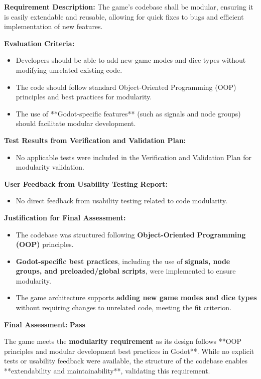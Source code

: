 \documentclass[12pt, titlepage]{article}
\begin{document}
\textbf{Requirement Description:}  
The game’s codebase shall be modular, ensuring it is easily extendable and reusable, allowing for quick fixes to bugs and efficient implementation of new features.

\textbf{Evaluation Criteria:}  
\begin{itemize}
    \item Developers should be able to add new game modes and dice types without modifying unrelated existing code.
    \item The code should follow standard Object-Oriented Programming (OOP) principles and best practices for modularity.
    \item The use of **Godot-specific features** (such as signals and node groups) should facilitate modular development.
\end{itemize}

\textbf{Test Results from Verification and Validation Plan:}  
\begin{itemize}
    \item No applicable tests were included in the Verification and Validation Plan for modularity validation.
\end{itemize}

\textbf{User Feedback from Usability Testing Report:}  
\begin{itemize}
    \item No direct feedback from usability testing related to code modularity.
\end{itemize}

\textbf{Justification for Final Assessment:}  
\begin{itemize}
    \item The codebase was structured following \textbf{Object-Oriented Programming (OOP)} principles.
    \item \textbf{Godot-specific best practices}, including the use of \textbf{signals, node groups, and preloaded/global scripts}, were implemented to ensure modularity.
    \item The game architecture supports \textbf{adding new game modes and dice types} without requiring changes to unrelated code, meeting the fit criterion.
\end{itemize}

\textbf{Final Assessment:} \textbf{Pass}  

The game meets the \textbf{modularity requirement} as its design follows **OOP principles and modular development best practices in Godot**. While no explicit tests or usability feedback were available, the structure of the codebase enables **extendability and maintainability**, validating this requirement.
\end{document}
